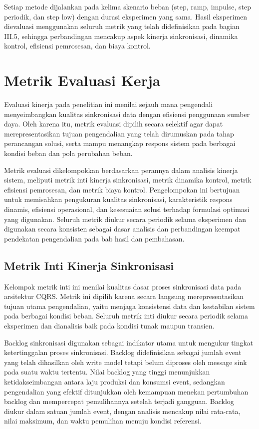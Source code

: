 Setiap metode dijalankan pada kelima skenario beban (step, ramp, impulse, step periodik, dan step low) dengan durasi eksperimen yang sama.
Hasil eksperimen dievaluasi menggunakan seluruh metrik yang telah didefinisikan pada bagian III.5, sehingga perbandingan mencakup aspek kinerja sinkronisasi, dinamika kontrol, efisiensi pemrosesan, dan biaya kontrol.

\section{Metrik Evaluasi Kerja}

Evaluasi kinerja pada penelitian ini menilai sejauh mana pengendali menyeimbangkan kualitas sinkronisasi data dengan efisiensi penggunaan sumber daya.
Oleh karena itu, metrik evaluasi dipilih secara selektif agar dapat merepresentasikan tujuan pengendalian yang telah dirumuskan pada tahap perancangan solusi, serta mampu menangkap respons sistem pada berbagai kondisi beban dan pola perubahan beban.

Metrik evaluasi dikelompokkan berdasarkan perannya dalam analisis kinerja sistem, meliputi metrik inti kinerja sinkronisasi, metrik dinamika kontrol, metrik efisiensi pemrosesan, dan metrik biaya kontrol.
Pengelompokan ini bertujuan untuk memisahkan pengukuran kualitas sinkronisasi, karakteristik respons dinamis, efisiensi operasional, dan kesesuaian solusi terhadap formulasi optimasi yang digunakan.
Seluruh metrik diukur secara periodik selama eksperimen dan digunakan secara konsisten sebagai dasar analisis dan perbandingan keempat pendekatan pengendalian pada bab hasil dan pembahasan.

\subsection{Metrik Inti Kinerja Sinkronisasi}

Kelompok metrik inti ini menilai kualitas dasar proses sinkronisasi data pada arsitektur CQRS.
Metrik ini dipilih karena secara langsung merepresentasikan tujuan utama pengendalian, yaitu menjaga konsistensi data dan kestabilan sistem pada berbagai kondisi beban.
Seluruh metrik inti diukur secara periodik selama eksperimen dan dianalisis baik pada kondisi tunak maupun transien.

Backlog sinkronisasi digunakan sebagai indikator utama untuk mengukur tingkat ketertinggalan proses sinkronisasi.
Backlog didefinisikan sebagai jumlah event yang telah dihasilkan oleh write model tetapi belum diproses oleh message sink pada suatu waktu tertentu.
Nilai backlog yang tinggi menunjukkan ketidakseimbangan antara laju produksi dan konsumsi event, sedangkan pengendalian yang efektif ditunjukkan oleh kemampuan menekan pertumbuhan backlog dan mempercepat pemulihannya setelah terjadi gangguan.
Backlog diukur dalam satuan jumlah event, dengan analisis mencakup nilai rata-rata, nilai maksimum, dan waktu pemulihan menuju kondisi referensi.

